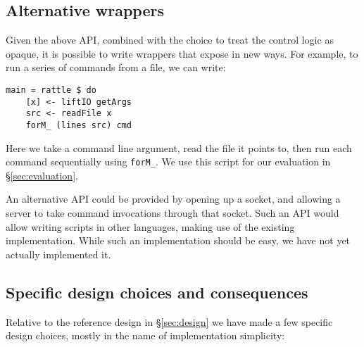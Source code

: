 \subsection{Alternative \Rattle wrappers}

Given the above API, combined with the choice to treat the control logic as opaque, it is possible to write wrappers that expose \Rattle in new ways. For example, to run a series of commands from a file, we can write:

\vspace{3mm}
\begin{verbatim}
main = rattle $ do
    [x] <- liftIO getArgs
    src <- readFile x
    forM_ (lines src) cmd
\end{verbatim}
\vspace{3mm}

Here we take a command line argument, read the file it points to, then run each command sequentially using \texttt{forM\_}. We use this script for our evaluation in \S\ref{sec:evaluation}.

An alternative API could be provided by opening up a socket, and allowing a \Rattle server to take command invocations through that socket. Such an API would allow writing \Rattle scripts in other languages, making use of the existing \Rattle implementation. While such an implementation should be easy, we have not yet actually implemented it.

\subsection{Specific design choices and consequences}
\label{sec:choices}

Relative to the reference design in \S\ref{sec:design} we have made a few specific design choices, mostly in the name of implementation simplicity:

